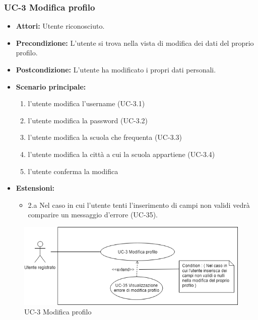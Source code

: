 \subsubsection{UC-3 Modifica profilo}
		\begin{itemize}
			\item \textbf{Attori:} Utente riconosciuto.
			\item \textbf{Precondizione:} L'utente si trova nella vista di modifica dei dati del proprio profilo.
			\item \textbf{Postcondizione:} L'utente ha modificato i propri dati personali.
			\item \textbf{Scenario principale:}
				\begin{enumerate}
					\item l'utente modifica l'username (UC-3.1)
					\item  l'utente modifica la password (UC-3.2)
					\item l'utente modifica la scuola che frequenta (UC-3.3) 
					\item l'utente modifica la città a cui la scuola appartiene (UC-3.4)
					\item l'utente conferma la modifica
				\end{enumerate}
				\item \textbf{Estensioni:}
				\begin{itemize}
					\item 2.a Nel caso in cui l'utente tenti l'inserimento di campi non validi vedrà comparire un messaggio d'errore (UC-35).
				\end{itemize}
		\end{itemize}
		\begin{figure}[htbp]
			\centering
			\includegraphics[scale=0.7]{images/UC-3.png}
			\caption{UC-3 Modifica profilo}
		\end{figure}
		
